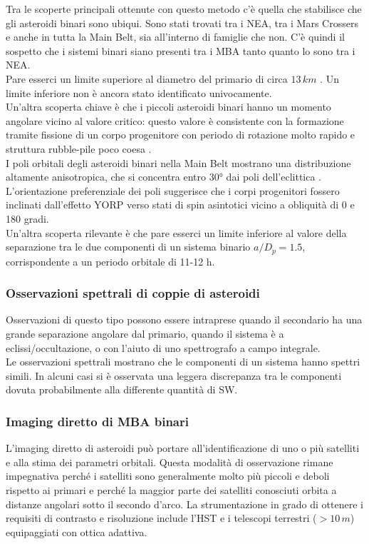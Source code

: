 \documentclass[a4paper,11pt,openright]{book}
\begin{document}
Tra le scoperte principali ottenute con questo metodo c'è quella che stabilisce che gli asteroidi binari sono ubiqui. Sono stati trovati tra i NEA, tra i Mars Crossers e anche in tutta la Main Belt, sia all'interno di famiglie che non. C'è quindi il sospetto che i sistemi binari siano presenti tra i MBA tanto quanto lo sono tra i NEA.\\ Pare esserci un limite superiore al diametro del primario di circa $13\,km$ \citep{carry_small_2015}. Un limite inferiore non è ancora stato identificato univocamente.\\
Un'altra scoperta chiave è che i piccoli asteroidi binari hanno un momento angolare vicino al valore critico: questo valore è consistente con la formazione tramite fissione di un corpo progenitore con periodo di rotazione molto rapido e struttura rubble-pile poco coesa \citep{pravec_binary_2007}.\\
I poli orbitali degli asteroidi binari nella Main Belt mostrano una distribuzione altamente anisotropica, che si concentra entro 30° dai poli dell'eclittica \citep{pravec_binary_2012}. L'orientazione preferenziale dei poli suggerisce che i corpi progenitori fossero inclinati dall'effetto YORP verso stati di spin asintotici vicino a obliquità di 0 e 180 gradi.\\
Un'altra scoperta rilevante è che pare esserci un limite inferiore al valore della separazione tra le due componenti di un sistema binario $a/D_p=1.5$, corrispondente a un periodo orbitale di 11-12 h.\\

\subsubsection{Osservazioni spettrali di coppie di asteroidi}
Osservazioni di questo tipo possono essere intraprese quando il secondario ha una grande separazione angolare dal primario, quando il sistema è a eclissi/occultazione, o con l'aiuto di uno spettrografo a campo integrale.\\
Le osservazioni spettrali mostrano che le componenti di un sistema hanno spettri simili. In alcuni casi si è osservata una leggera discrepanza tra le componenti dovuta probabilmente alla differente quantità di SW.

\subsubsection{Imaging diretto di MBA binari}
L'imaging diretto di asteroidi può portare all'identificazione di uno o più satelliti e alla stima dei parametri orbitali. Questa modalità di osservazione rimane impegnativa perché i satelliti sono generalmente molto più piccoli e deboli rispetto ai primari e perché la maggior parte dei satelliti conosciuti orbita a distanze angolari sotto il secondo d'arco. La strumentazione in grado di ottenere i requisiti di contrasto e risoluzione include l'HST e i telescopi terrestri ($>10\,m$) equipaggiati con ottica adattiva.
\end{document}
